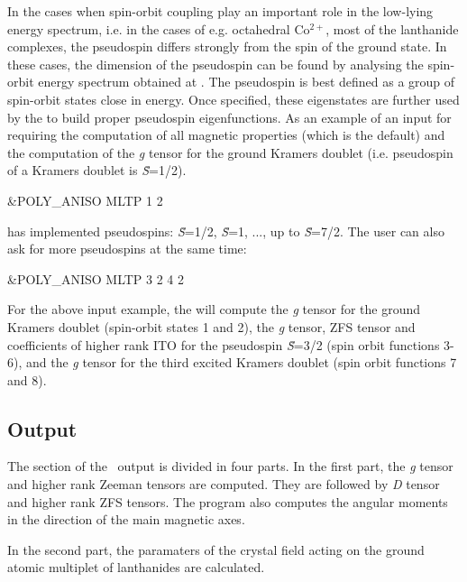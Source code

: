 In the cases when spin-orbit coupling play an important role in the low-lying energy spectrum, i.e. in the cases of e.g. octahedral Co$^{2+}$,
 most of the lanthanide complexes, the pseudospin differs strongly from the spin of the ground state. In these cases,
the dimension of the pseudospin can be found by analysing the spin-orbit energy spectrum obtained at .
The pseudospin is best defined as a group of spin-orbit states close in energy. Once specified, these eigenstates are further used
by the  to build proper pseudospin eigenfunctions. As an example of an input for 
requiring the computation of all magnetic properties (which is the default) and the computation of the {\it g} tensor for the ground
Kramers doublet (i.e. pseudospin of a Kramers doublet is \textit{\~{S}}=1/2).

\begin{inputlisting}
 &POLY_ANISO
  MLTP
  1
  2
\end{inputlisting}

 has implemented pseudospins: \textit{\~{S}}=1/2, \textit{\~{S}}=1, ..., up to \textit{\~{S}}=7/2. The user can also ask for more pseudospins at the same time:

\begin{inputlisting}
 &POLY_ANISO
  MLTP
  3
  2 4 2
\end{inputlisting}
For the above input example, the  will compute the {\it g} tensor for the ground Kramers doublet
(spin-orbit states 1 and 2), the {\it g} tensor, ZFS tensor and coefficients of higher rank ITO for the pseudospin
\textit{\~{S}}=3/2 (spin orbit functions 3-6), and the  {\it g} tensor for the third excited Kramers doublet (spin orbit functions 7 and 8).

\subsection{ Output}


The  section of the \molcas\ output is divided in four parts. In the first part, the \textit{g} tensor and higher rank Zeeman tensors are computed. They are followed by \textit{D} tensor and higher rank ZFS tensors. The program also computes the angular moments in the direction of the main magnetic axes.

In the second part, the paramaters of the crystal field acting on the ground atomic multiplet of lanthanides are calculated.

